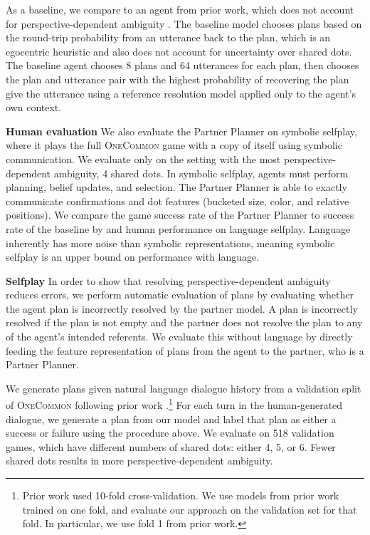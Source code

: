 \documentclass[11pt]{article}
\begin{document}
As a baseline, we compare to an agent from prior work, which does not account for
perspective-dependent ambiguity \citep{fried}.
The baseline model chooses plans based on the round-trip probability from an utterance back to the plan,
which is an egocentric heuristic and also does not account for
uncertainty over shared dots.
The baseline agent chooses 8 plans and 64 utterances for each plan, then chooses the
plan and utterance pair with the highest probability of recovering the plan give
the utterance using a reference resolution model applied only to the agent's own context.

\textbf{Human evaluation}
We also evaluate the Partner Planner on symbolic selfplay,
where it plays the full \textsc{OneCommon} game with a copy of itself using symbolic communication.
We evaluate only on the setting with the most perspective-dependent ambiguity, 4 shared dots.
In symbolic selfplay, agents must perform planning, belief updates, and selection.
The Partner Planner is able to exactly communicate confirmations and dot features (bucketed size, color, and relative positions).
We compare the game success rate of the Partner Planner to success rate of the baseline by \cite{fried} and human performance on language selfplay.
Language inherently has more noise than symbolic representations,
meaning symbolic selfplay is an upper bound on performance with language.


\textbf{Selfplay}
In order to show that resolving perspective-dependent
ambiguity reduces errors,
we perform automatic evaluation of plans by evaluating whether the agent plan is incorrectly resolved by the partner model.
A plan is incorrectly resolved if the plan is not empty and the partner does not resolve the plan to any
of the agent's intended referents.
We evaluate this without language by directly feeding the feature
representation of plans from the agent to the partner, who is a Partner Planner.

We generate plans given natural language dialogue history from a validation split of \textsc{OneCommon} following prior work \citep{fried}.\footnote{
Prior work used 10-fold cross-validation.
We use models from prior work trained on one fold, and evaluate our approach
on the validation set for that fold.
In particular, we use fold 1 from prior work.
}
For each turn in the human-generated dialogue, we generate a plan from our model
and label that plan as either a success or failure using the procedure above.
We evaluate on 518 validation games, which have different numbers of shared dots: either 4, 5, or 6.
Fewer shared dots results in more perspective-dependent ambiguity.
\end{document}
